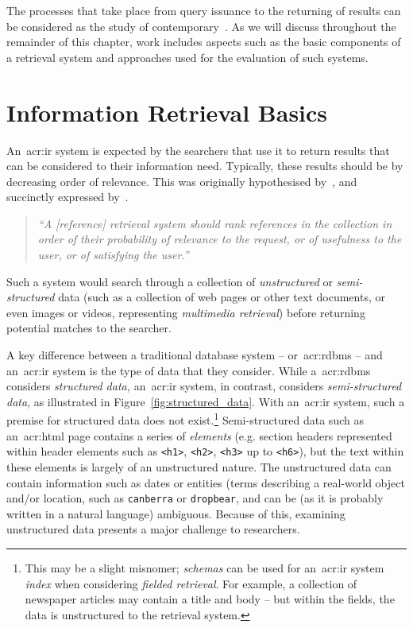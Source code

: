 The processes that take place from query issuance to the returning of results can be considered as the study of contemporary~. As we will discuss throughout the remainder of this chapter, work includes aspects such as the basic components of a retrieval system and approaches used for the evaluation of such systems.

\section{Information Retrieval Basics}
An~\gls{acr:ir} system is expected by the searchers that use it to return results that can be considered  to their information need. Typically, these results should be  by decreasing order of relevance. This was originally hypothesised by~\cite{luhn1957ranking_query}, and succinctly expressed by~\cite{robertson1977prp}.

\begin{quote}
    \emph{``A [reference] retrieval system should rank references in the collection in order of their probability of relevance to the request, or of usefulness to the user, or of satisfying the user.''}
\end{quote}

Such a system would search through a collection of \emph{unstructured} or \emph{semi-structured} data (such as a collection of web pages or other text documents, or even images or videos, representing \emph{multimedia retrieval}) before returning potential matches to the searcher.

A key difference between a traditional database system -- or~\gls{acr:rdbms} -- and an~\gls{acr:ir} system is the type of data that they consider. While a~\gls{acr:rdbms} considers \emph{structured data,} an~\gls{acr:ir} system, in contrast, considers \emph{semi-structured data}, as illustrated in Figure~\ref{fig:structured_data}. With an~\gls{acr:ir} system, such a premise for structured data does not exist.\footnote{This may be a slight misnomer; \emph{schemas} can be used for an~\gls{acr:ir} system \emph{index} when considering \emph{fielded retrieval}. For example, a collection of newspaper articles may contain a title and body -- but within the fields, the data is unstructured to the retrieval system.} Semi-structured data such as an~\gls{acr:html} page contains a series of \emph{elements} (e.g. section headers represented within header elements such as \texttt{<h1>}, \texttt{<h2>}, \texttt{<h3>} up to \texttt{<h6>}), but the text within these elements is largely of an unstructured nature. The unstructured data can contain information such as dates or entities (terms describing a real-world object and/or location, such as \texttt{canberra} or \texttt{dropbear}, and can be (as it is probably written in a natural language) ambiguous. Because of this, examining unstructured data presents a major challenge to researchers.

